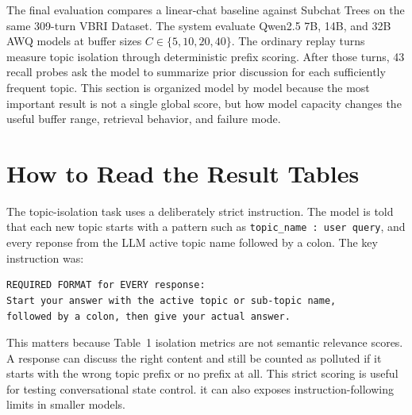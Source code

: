 
The final evaluation compares a linear-chat baseline against Subchat Trees on the same 309-turn VBRI Dataset. The system evaluate Qwen2.5 7B, 14B, and 32B AWQ models at buffer sizes $C \in \{5,10,20,40\}$. The ordinary replay turns measure topic isolation through deterministic prefix scoring. After those turns, 43 recall probes ask the model to summarize prior discussion for each sufficiently frequent topic. This section is organized model by model because the most important result is not a single global score, but how model capacity changes the useful buffer range, retrieval behavior, and failure mode.

\section{How to Read the Result Tables}\label{subsec:reading_results}



The topic-isolation task uses a deliberately strict instruction. The model is told that each new topic starts with a pattern such as \texttt{topic\_name : user query}, and every reponse from the LLM active topic name followed by a colon. The key instruction was:


\begin{verbatim}
REQUIRED FORMAT for EVERY response:
Start your answer with the active topic or sub-topic name,
followed by a colon, then give your actual answer.
\end{verbatim}

This matters because Table~1 isolation metrics are not semantic relevance scores. A response can discuss the right content and still be counted as polluted if it starts with the wrong topic prefix or no prefix at all. This strict scoring is useful for testing conversational state control. it can also exposes instruction-following limits in smaller models.


